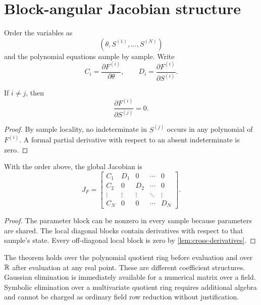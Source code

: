 \section{Block-angular Jacobian structure}
\label{sec:block-jacobian}

Order the variables as
\begin{equation}
  (\theta,S^{(1)},\ldots,S^{(N)})
\end{equation}
and the polynomial equations sample by sample.  Write
\begin{equation}
  C_i=\frac{\partial F^{(i)}}{\partial\theta},
  \qquad
  D_i=\frac{\partial F^{(i)}}{\partial S^{(i)}}.
\end{equation}

\begin{lemma}
\label{lem:cross-derivatives}
If \(i\ne j\), then
\begin{equation}
  \frac{\partial F^{(i)}}{\partial S^{(j)}}=0.
\end{equation}
\end{lemma}

\begin{proof}
By sample locality, no indeterminate in \(S^{(j)}\) occurs in any polynomial of
\(F^{(i)}\).  A formal partial derivative with respect to an absent
indeterminate is zero.
\end{proof}

\begin{theorem}
\label{thm:block-jacobian}
With the order above, the global Jacobian is
\begin{equation}
J_F=
\begin{bmatrix}
C_1&D_1&0&\cdots&0\\
C_2&0&D_2&\cdots&0\\
\vdots&\vdots&\vdots&\ddots&\vdots\\
C_N&0&0&\cdots&D_N
\end{bmatrix}.
\label{eq:block-jacobian}
\end{equation}
\end{theorem}

\begin{proof}
The parameter block can be nonzero in every sample because parameters are
shared.  The local diagonal blocks contain derivatives with respect to that
sample's state.  Every off-diagonal local block is zero by
\cref{lem:cross-derivatives}.
\end{proof}

The theorem holds over the polynomial quotient ring before evaluation and over
\(\mathbb{R}\) after evaluation at any real point.  These are different coefficient
structures.  Gaussian elimination is immediately available for a numerical
matrix over a field.  Symbolic elimination over a multivariate quotient ring
requires additional algebra and cannot be charged as ordinary field row
reduction without justification.

